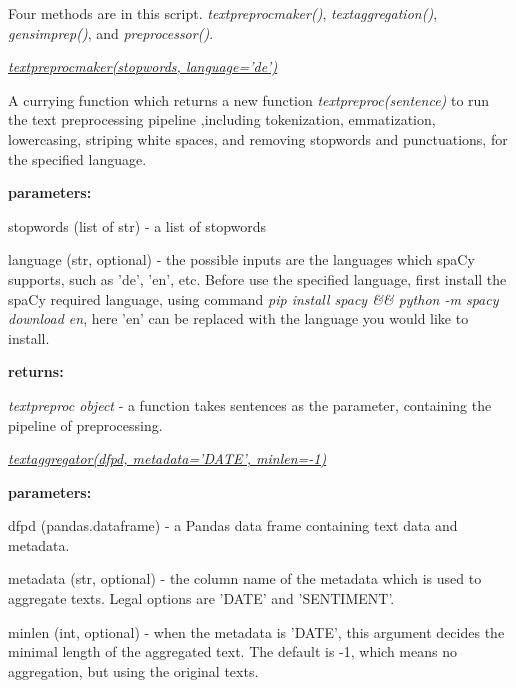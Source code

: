 \documentclass{article} %
\begin{document}
Four methods are in this script. \textit{text\textunderscore{}preproc\textunderscore{}maker()}, \textit{text\textunderscore{}aggregation()}, \textit{gensim\textunderscore{}prep()}, and \textit{preprocessor()}.

\underline{\textit{text\textunderscore{}preproc\textunderscore{}maker(stopwords, language='de')}}

A currying function which returns a new function \textit{text\textunderscore{}preproc(sentence)} to run the text preprocessing pipeline ,including tokenization, emmatization, lowercasing, striping white spaces, and removing stopwords and punctuations, for the specified language.

\textbf{parameters: }
\begin{compactitem}
      \item stopwords (list of str) - a list of stopwords
      \item language (str, optional) - the possible inputs are the languages which spaCy supports, such as 'de', 'en', etc. Before use the specified language, first install the spaCy required language, using command \textit{pip install spacy \&\& python -m spacy download en}, here 'en' can be replaced with the language you would like to install.
\end{compactitem}

\textbf{returns:}
\begin{compactitem}
      \item \textit{text\textunderscore{}preproc object} - a function takes sentences as the parameter, containing the pipeline of preprocessing.
\end{compactitem}

\underline{\textit{text\textunderscore{}aggregator(df\textunderscore{}pd, metadata='DATE', min\textunderscore{}len=-1)}}

\textbf{parameters: }
\begin{compactitem}
      \item df\textunderscore{}pd (pandas.dataframe) - a Pandas data frame containing text data and metadata.
      \item metadata (str, optional) - the column name of the metadata which is used to aggregate texts. Legal options are 'DATE' and 'SENTIMENT'.
      \item min\textunderscore{}len (int, optional) - when the metadata is 'DATE', this argument decides the minimal length of the aggregated text. The default is -1, which means no aggregation, but using the original texts.
\end{compactitem}
\end{document}
